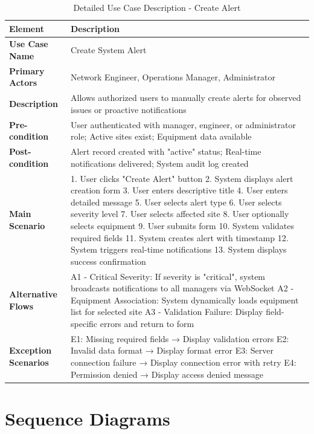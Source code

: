 \begin{table}[H]
\centering
\small
\begin{tabular}{|p{3cm}|p{8.5cm}|}
\hline
\textbf{Element} & \textbf{Description} \\
\hline
\textbf{Use Case Name} & Create System Alert \\
\hline
\textbf{Primary Actors} & Network Engineer, Operations Manager, Administrator \\
\hline
\textbf{Description} & Allows authorized users to manually create alerts for observed issues or proactive notifications \\
\hline
\textbf{Pre-condition} & User authenticated with manager, engineer, or administrator role; Active sites exist; Equipment data available \\
\hline
\textbf{Post-condition} & Alert record created with "active" status; Real-time notifications delivered; System audit log created \\
\hline
\textbf{Main Scenario} & 
1. User clicks "Create Alert" button
2. System displays alert creation form
3. User enters descriptive title
4. User enters detailed message
5. User selects alert type
6. User selects severity level
7. User selects affected site
8. User optionally selects equipment
9. User submits form
10. System validates required fields
11. System creates alert with timestamp
12. System triggers real-time notifications
13. System displays success confirmation
\\
\hline
\textbf{Alternative Flows} & 
A1 - Critical Severity: If severity is "critical", system broadcasts notifications to all managers via WebSocket
A2 - Equipment Association: System dynamically loads equipment list for selected site
A3 - Validation Failure: Display field-specific errors and return to form
\\
\hline
\textbf{Exception Scenarios} & 
E1: Missing required fields → Display validation errors
E2: Invalid data format → Display format error
E3: Server connection failure → Display connection error with retry
E4: Permission denied → Display access denied message
\\
\hline
\end{tabular}
\caption{Detailed Use Case Description - Create Alert}
\label{tab:create_alert_usecase}
\end{table}

\section{Sequence Diagrams}

